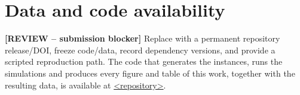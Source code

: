 \section*{Data and code availability}

{\color{red}\textbf{[REVIEW -- submission blocker]} Replace with a permanent repository release/DOI, freeze code/data, record dependency versions, and provide a scripted reproduction path.}
The code that generates the instances, runs the simulations and produces
every figure and table of this work, together with the resulting data, is
available at \url{<repository>}.